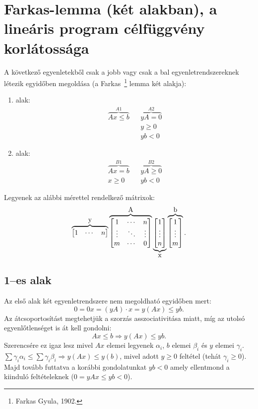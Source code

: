 \skiptooddpage
\section{Farkas-lemma (két alakban), a lineáris program célfüggvény korlátossága}

A következő egyenletekből csak a jobb vagy csak a bal egyenletrendszereknek
létezik egyidőben megoldása (a Farkas~\footnote{Farkas Gyula, 1902.} lemma két
alakja):

\begin{enumerate}
  \item alak: \begin{align*}
  \overbrace{Ax \leq b}^{A1}  && \overbrace{yA= 0}^{A2}\\
   			 && y\geq 0 \\
             && yb< 0
  \end{align*}
  \item alak:\begin{align*}
  \overbrace{Ax = b }^{B1}   && \overbrace{yA \geq 0}^{B2}\\
  x \geq 0 && yb < 0 
  \end{align*}
\end{enumerate}

Legyenek az alábbi mérettel rendelkező mátrixok:
\[
\overbrace{\begin{bmatrix} 1 &  \cdots &  n \end{bmatrix}}^{\hbox{y}} 
\overbrace{\begin{bmatrix} 1 & \cdots & n \\ \vdots & \ddots & \vdots \\ m  & \cdots & 0 \end{bmatrix}}^{\hbox{A}}
\underbrace{\begin{bmatrix} 1 \\ \vdots \\  n \end{bmatrix}}_{\hbox{x}}
\overbrace{\begin{bmatrix} 1 \\ \vdots \\  m \end{bmatrix}}^{\hbox{b}}.
\]

\subsection{1--es alak}
Az első alak két egyenletrendszere nem megoldható egyidőben mert:
\[ 0 = 0x = (yA) \cdot x = y(Ax) \leq yb.\] Az átcsoportosítást megtehetjük a
szorzás asszociativitása miatt, míg az utolsó egyenlőtlenséget is át kell
gondolni: \[ Ax \leq b \Rightarrow y(Ax) \leq yb.\] Szerencsére ez igaz lesz
mivel $Ax$ elemei legyenek $\alpha_i$, $b$ elemei $\beta_i$ és $y$ elemei
$\gamma_i$.
$\sum\gamma_i \alpha_i \leq \sum \gamma_i \beta_i \Rightarrow y(Ax) \leq y(b)$,
mivel adott $y \geq 0$ feltétel (tehát $\gamma_i \geq 0$). Majd tovább futtatva a
korábbi gondolatunkat $yb<0$ amely ellentmond a kiinduló feltételeknek ($0=yAx \leq yb<0$). 

